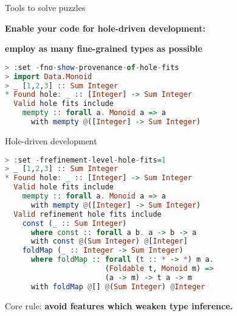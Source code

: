 \documentclass[handout]{beamer}
\begin{document}
\begin{frame}[fragile]{Tools to solve puzzles}

\centerline{\bf Enable your code for hole-driven development:}
\centerline{\bf employ as many fine-grained types as possible}

\pause

\bigskip
\bigskip

\begin{lstlisting}[language=Haskell]
> :set -fno-show-provenance-of-hole-fits
> import Data.Monoid
> _ [1,2,3] :: Sum Integer
* Found hole: _ :: [Integer] -> Sum Integer
  Valid hole fits include
    mempty :: forall a. Monoid a => a
      with mempty @([Integer] -> Sum Integer)
\end{lstlisting}

\end{frame}

\begin{frame}[fragile]{Hole-driven development}

\begin{lstlisting}[language=Haskell]
> :set -frefinement-level-hole-fits=1
> _ [1,2,3] :: Sum Integer
* Found hole: _ :: [Integer] -> Sum Integer
  Valid hole fits include
    mempty :: forall a. Monoid a => a
      with mempty @([Integer] -> Sum Integer)
  Valid refinement hole fits include
    const (_ :: Sum Integer)
      where const :: forall a b. a -> b -> a
      with const @(Sum Integer) @[Integer]
    foldMap (_ :: Integer -> Sum Integer)
      where foldMap :: forall (t :: * -> *) m a.
                       (Foldable t, Monoid m) =>
                       (a -> m) -> t a -> m
      with foldMap @[] @(Sum Integer) @Integer
\end{lstlisting}

\centerline{
  Core rule: {\bf avoid features which weaken type inference.}
}

\end{frame}
\end{document}
